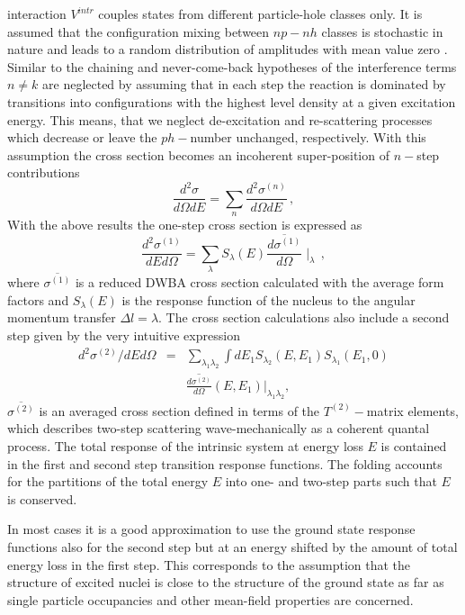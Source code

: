 \documentclass[twocolumn,amsmath,amssymb,10pt,groupedaddress,a4paper]{revtex4}
\begin{document}
interaction $V^{intr}$ couples states from different particle-hole
classes only. It is assumed that the configuration mixing between
$np-nh$ classes is stochastic in nature and leads to a random distribution
of amplitudes with mean value zero \cite{LW92}. Similar to the chaining and
never-come-back hypotheses of \cite{FKK}
the interference terms $n\ne k$ are neglected by assuming that in
each step the reaction is dominated by transitions into configurations
with the highest level density at a given excitation energy. This
means, that we neglect de-excitation and re-scattering processes which
decrease or leave the $ph-$number unchanged, respectively. With this
assumption the cross section becomes an incoherent super-position
of $n-$step contributions
\begin{equation}
\frac{d^{2}\sigma}{d\Omega dE}=\sum_{n}{\frac{d^{2}\sigma^{(n)}}{d\Omega dE}}\,,
\label{sigma0}
\end{equation}
With the above results the one-step cross section is expressed as
\begin{equation}
\frac{d^{2}\sigma^{(1)}}{dEd\Omega}=\sum_{\lambda}{S_{\lambda}(E)\overline{\frac{d\sigma^{(1)}}{d\Omega}}\mid_{\lambda}}\,,
\label{sigma1}
\end{equation}
\noindent where $\overline{\sigma^{(1)}}$ is a reduced DWBA cross
section calculated with the average form factors
and $S_{\lambda}(E)$ is the response function of the nucleus to the
angular momentum transfer $\Delta l=\lambda$.
The cross section calculations also include a second step given by the
 very intuitive expression
\begin{eqnarray}
{d^{2}\sigma^{(2)}}/{dEd\Omega}&=&
\sum_{\lambda_{1}\lambda_{2}}{\int dE_{1}S_{\lambda_{2}}(E,E_{1})S_{\lambda_{1}}(E_{1},0)}\nonumber\\
&& \overline{\frac{d\sigma^{(2)}}{d\Omega}}(E,E_{1})|_{\lambda_{1}\lambda_{2}},\label{sigma2}
\end{eqnarray}
$\overline{\sigma^{(2)}}$ is an averaged cross section defined in
terms of the $T^{(2)}-$matrix elements, which describes
two-step scattering wave-mechanically as a coherent quantal process.
The total response of the intrinsic system at energy loss $E$ is
contained in the first and second step transition response functions.
The folding accounts for the partitions of the total energy $E$ into
one- and two-step parts such that $E$ is conserved.

In most cases it is a good approximation
to use the ground state response functions also for the second step
but at an energy shifted by the amount of total energy loss in the
first step. This corresponds to the assumption that the structure
of excited nuclei is close to the structure of the ground state as
far as single particle occupancies and other mean-field properties
are concerned.
\end{document}
